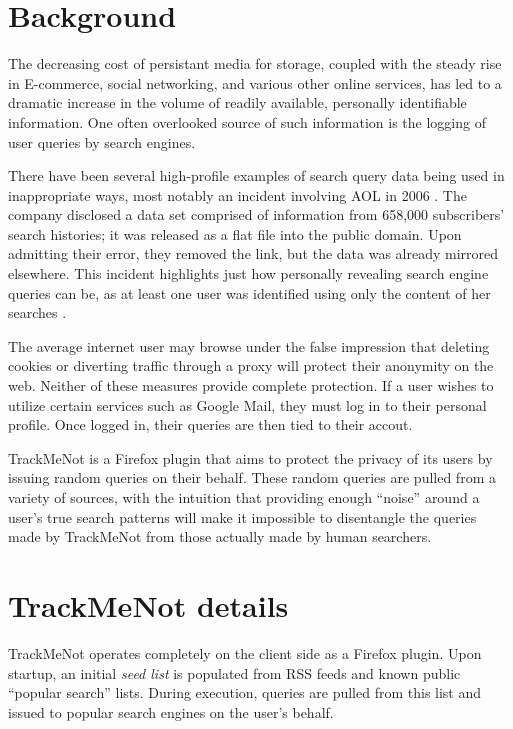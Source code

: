 \documentclass[11pt]{article}
\begin{document}
\begin{multicols}{2}
\section{Background}
\label{sec:background}

The decreasing cost of persistant media for storage, coupled with the
steady rise in E-commerce, social networking, and various other online
services, has led to a dramatic increase in the volume of readily
available, personally identifiable information. One often overlooked
source of such information is the logging of user queries by search
engines.

There have been several high-profile examples of search query data
being used in inappropriate ways, most notably an incident involving
AOL in 2006 \cite{aol}. The company disclosed a data set comprised of
information from 658,000 subscribers' search histories; it was
released as a flat file into the public domain. Upon admitting their
error, they removed the link, but the data was already mirrored
elsewhere. This incident highlights just how personally revealing
search engine queries can be, as at least one user was identified
using only the content of her searches \cite{user4417749}.

The average internet user may browse under the false impression that
deleting cookies or diverting traffic through a proxy will protect
their anonymity on the web. Neither of these measures provide complete
protection. If a user wishes to utilize certain services such as
Google Mail, they must log in to their personal profile. Once logged
in, their queries are then tied to their accout.

TrackMeNot is a Firefox plugin that aims to protect the privacy of its users by issuing random queries on their behalf. These random queries are pulled from a variety of sources, with the intuition that providing enough ``noise'' around a user's true search patterns will make it impossible to disentangle the queries made by TrackMeNot from those actually made by human searchers.

\section{TrackMeNot details}
\label{sec:tmn}
TrackMeNot operates completely on the client side as a Firefox plugin. Upon startup, an initial {\it seed list} is populated from RSS feeds and known public ``popular search'' lists. During execution, queries are pulled from this list and issued to popular search engines on the user's behalf.


\end{multicols}
\end{document}
